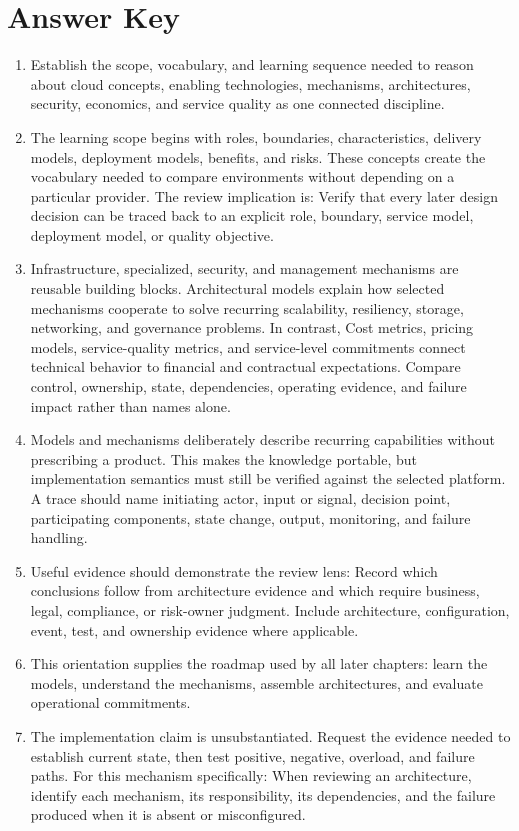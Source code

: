 \documentclass[11pt]{article}
\begin{document}
\section{Answer Key}
\begin{enumerate}
\item Establish the scope, vocabulary, and learning sequence needed to reason about cloud concepts, enabling technologies, mechanisms, architectures, security, economics, and service quality as one connected discipline.
\item The learning scope begins with roles, boundaries, characteristics, delivery models, deployment models, benefits, and risks. These concepts create the vocabulary needed to compare environments without depending on a particular provider. The review implication is: Verify that every later design decision can be traced back to an explicit role, boundary, service model, deployment model, or quality objective.
\item Infrastructure, specialized, security, and management mechanisms are reusable building blocks. Architectural models explain how selected mechanisms cooperate to solve recurring scalability, resiliency, storage, networking, and governance problems. In contrast, Cost metrics, pricing models, service-quality metrics, and service-level commitments connect technical behavior to financial and contractual expectations. Compare control, ownership, state, dependencies, operating evidence, and failure impact rather than names alone.
\item Models and mechanisms deliberately describe recurring capabilities without prescribing a product. This makes the knowledge portable, but implementation semantics must still be verified against the selected platform. A trace should name initiating actor, input or signal, decision point, participating components, state change, output, monitoring, and failure handling.
\item Useful evidence should demonstrate the review lens: Record which conclusions follow from architecture evidence and which require business, legal, compliance, or risk-owner judgment. Include architecture, configuration, event, test, and ownership evidence where applicable.
\item This orientation supplies the roadmap used by all later chapters: learn the models, understand the mechanisms, assemble architectures, and evaluate operational commitments.
\item The implementation claim is unsubstantiated. Request the evidence needed to establish current state, then test positive, negative, overload, and failure paths. For this mechanism specifically: When reviewing an architecture, identify each mechanism, its responsibility, its dependencies, and the failure produced when it is absent or misconfigured.

\end{enumerate}
\end{document}
